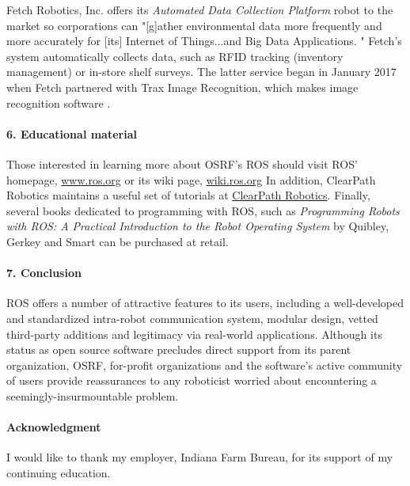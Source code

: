 \documentclass[9pt,twocolumn,twoside]{styles/osajnl}
\begin{document}
Fetch Robotics, Inc. offers its \textit{Automated Data Collection Platform} robot to the market so corporations can "[g]ather environmental data more frequently and more accurately for [its] Internet of Things...and Big Data Applications. \cite{www-ros-fetch}" Fetch's system automatically collects data, such as RFID tracking (inventory management) or in-store shelf surveys. The latter service began in January 2017 when Fetch partnered with Trax Image Recognition, which makes image recognition software \cite{www-ros-trax}.  

\paragraph{6. Educational material}

Those interested in learning more about OSRF's ROS should visit ROS' homepage, \url{www.ros.org} or its wiki page, \url{wiki.ros.org}  In addition, ClearPath Robotics maintains a useful set of tutorials at \href{https://www.clearpathrobotics.com/assets/guides/ros/}{ClearPath Robotics}.  Finally, several books dedicated to programming with ROS, such as \textit{Programming Robots with ROS: A Practical Introduction to the Robot Operating System} by Quibley, Gerkey and Smart can be purchased at retail.
\paragraph{7. Conclusion}

ROS offers a number of attractive features to its users, including a well-developed and standardized intra-robot communication system, modular design, vetted third-party additions and legitimacy via real-world applications.  Although its status as open source software precludes direct support from its parent organization, OSRF, for-profit organizations and the software's active community of users provide reassurances to any roboticist worried about encountering a seemingly-insurmountable problem.   

\paragraph{Acknowledgment}

I would like to thank my employer, Indiana Farm Bureau, for its support of my continuing education.




 
\end{document}
